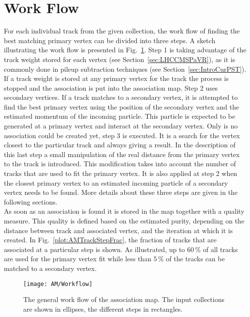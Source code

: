 \section{Work Flow \label{sec:AMWorkflow}}

For each individual track from the given collection, the work flow of finding the best matching primary vertex can be divided into three steps. A sketch illustrating the work flow is presented in Fig.~\ref{plot:AMWorkSketch}. Step 1 is taking advantage of the track weight stored for each vertex (see Section~\ref{sec:LHCCMSPaVR}), as it is commonly done in pileup subtraction techniques (see Section~\ref{sec:IntroCurPST}). If a track weight is stored at any primary vertex for the track the process is stopped and the association is put into the association map. Step 2 uses secondary vertices. If a track matches to a secondary vertex, it is attempted to find the best primary vertex using the position of the secondary vertex and the estimated momentum of the incoming particle. This particle is expected to be generated at a primary vertex and interact at the secondary vertex. Only is no association could be created yet, step 3 is executed. It is a search for the vertex closest to the particular track and always giving a result. In the description of this last step a small manipulation of the real distance from the primary vertex to the track is introduced. This modification takes into account the number of tracks that are used to fit the primary vertex. It is also applied at step 2 when the closest primary vertex to an estimated incoming particle of a secondary vertex needs to be found. More details about these three steps are given in the following sections.  \\
As soon as an association is found it is stored in the map together with a quality measure. This quality is defined based on the estimated purity, depending on the distance between track and associated vertex, and the iteration at which it is created. In Fig.~\ref{plot:AMTrackStepFrac}, the fraction of tracks that are associated at a particular step is shown. As illustrated, up to $60\,\%$ of all tracks are used for the primary vertex fit while less than $5\,\%$ of the tracks can be matched to a secondary vertex.

\begin{figure}[!ht]
    \centering
    \texttt{[image: AM/Workflow]}
    \caption[Sketch of the work flow of the association map]{The general work flow of the association map. The input collections are shown in ellipses, the different steps in rectangles. \label{plot:AMWorkSketch}}
\end{figure}

